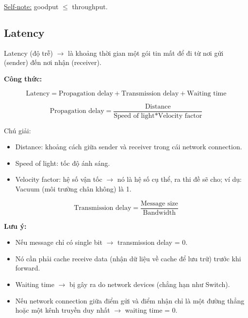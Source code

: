 \underline{Self-note:} goodput $\le$ throughput.

\subsection{Latency}

\noindent
Latency (độ trễ) $\rightarrow$ là khoảng thời gian một gói tin mất để đi từ nơi gửi (sender) đến nơi nhận (receiver).
\medskip

\noindent
\textbf{Công thức:}

\begin{equation*}
    \text{Latency} = \text{Propagation delay} + \text{Transmission delay} + \text{Waiting time}
\end{equation*}

\begin{equation*}
    \text{Propagation delay} = \frac{\text{Distance}}{\text{Speed of light} * \text{Velocity factor}}
\end{equation*}
\medskip

\noindent
Chú giải:

\begin{itemize}
    \item Distance: khoảng cách giữa sender và receiver trong cái network connection.
    \item Speed of light: tốc độ ánh sáng.
    \item Velocity factor: hệ số vận tốc $\rightarrow$ nó là hệ số cụ thể, ra thi đề sẽ cho; ví dụ: Vacuum (môi trường chân không) là 1.
\end{itemize}
\medskip

\begin{equation*}
    \text{Transmission delay} = \frac{\text{Message size}}{\text{Bandwidth}}
\end{equation*}
\medskip

\noindent
\textbf{Lưu ý:}

\begin{itemize}
    \item Nếu message chỉ có single bit $\rightarrow$ transmission delay = 0.
    \item Nó cần phải cache receive data (nhận dữ liệu về cache để lưu trữ) trước khi forward.
    \item Waiting time $\rightarrow$ bị gây ra do network devices (chẳng hạn như Switch).
    \item Nếu network connection giữa điểm gửi và điểm nhận chỉ là một đường thẳng hoặc một kênh truyền duy nhất $\rightarrow$ waiting time = 0.
\end{itemize}
\medskip

